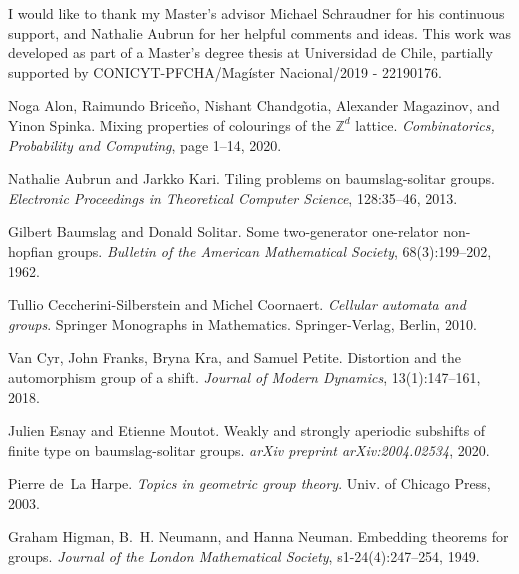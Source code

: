 \documentclass[cupthm,crop,info]{CUP-JNL-ETS}%
\theoremstyle{cupplain}
\theoremstyle{cupdefinition}
\theoremstyle{cupremark}
\theoremstyle{cupproof}
\numberwithin{equation}{section}
\begin{document}
\begin{Backmatter}

\begin{ack}
I would like to thank my Master's advisor Michael Schraudner for his continuous support, and Nathalie Aubrun for her helpful comments and ideas. This work was developed as part of a Master's degree thesis at Universidad de Chile, partially supported by CONICYT-PFCHA/Mag\'ister Nacional/2019 - 22190176.
\end{ack}

\newcommand{\etalchar}[1]{$^{#1}$}

\begin{thebibliography}{10}

	
Noga Alon, Raimundo Brice{\~n}o, Nishant Chandgotia, Alexander Magazinov, and
Yinon Spinka. Mixing properties of colourings of the {$\mathbb{Z}^{d}$} lattice. {\em Combinatorics, Probability and Computing}, page 1–14, 2020.

	Nathalie Aubrun and Jarkko Kari.
Tiling problems on baumslag-solitar groups. {\em Electronic Proceedings in Theoretical Computer Science}, 128:35–46, 2013.

	

	Gilbert Baumslag and Donald Solitar.
Some two-generator one-relator non-hopfian groups.
 {\em Bulletin of the American Mathematical Society}, 68(3):199–202, 1962.

Tullio Ceccherini-Silberstein and Michel Coornaert.
 {\em Cellular automata and groups}.
 Springer Monographs in Mathematics. Springer-Verlag, Berlin, 2010.
	
Van Cyr, John Franks, Bryna Kra, and Samuel Petite. Distortion and the automorphism group of a shift. {\em Journal of Modern Dynamics}, 13(1):147–161, 2018.

	Julien Esnay and Etienne Moutot.
Weakly and strongly aperiodic subshifts of finite type on baumslag-solitar groups. {\em arXiv preprint  arXiv:2004.02534}, 2020.

Pierre de~La Harpe. {\em Topics in geometric group theory}. Univ. of Chicago Press, 2003.

	

	Graham Higman, B.~H. Neumann, and Hanna Neuman. Embedding theorems for groups.
{\em Journal of the London Mathematical Society}, s1-24(4):247--254, 1949.


\end{thebibliography}
\end{Backmatter}
\end{document}

